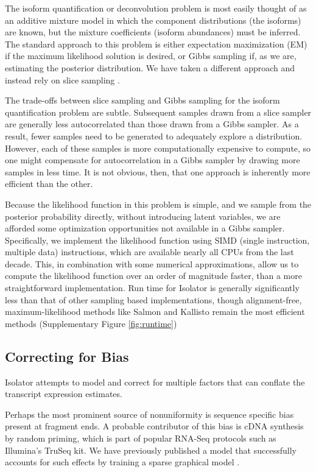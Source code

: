\documentclass[twocolumn]{article}
\begin{document}
The isoform quantification or deconvolution problem is most easily
thought of as an additive mixture model in which the component
distributions (the isoforms) are known, but the mixture coefficients
(isoform abundances) must be inferred. The standard approach to this
problem is either expectation maximization (EM) if the maximum likelihood
solution is desired, or Gibbs sampling if, as we are, estimating the
posterior distribution. We have taken a different approach and instead
rely on slice sampling \cite{Neal:2000uc}.

The trade-offs between slice sampling and Gibbs sampling for the isoform
quantification problem are subtle. Subsequent samples drawn from a slice
sampler are generally less autocorrelated than those drawn from a Gibbs
sampler. As a result, fewer samples need to be generated to adequately
explore a distribution. However, each of these samples is more
computationally expensive to compute, so one might compensate for
autocorrelation in a Gibbs sampler by drawing more samples in less time.
It is not obvious, then, that one approach is inherently more efficient
than the other.

Because the likelihood function in this problem is simple, and we sample from
the posterior probability directly, without introducing latent variables, we are
afforded some optimization opportunities not available in a Gibbs sampler.
Specifically, we implement the likelihood function using SIMD (single
instruction, multiple data) instructions, which are available nearly all CPUs
from the last decade. This, in combination with some numerical approximations,
allow us to compute the likelihood function over an order of magnitude faster,
than a more straightforward implementation. Run time for Isolator is generally
significantly less than that of other sampling based implementations, though
alignment-free, maximum-likelihood methods like Salmon and Kallisto remain the
most efficient methods (Supplementary Figure \ref{fig:runtime})

\subsection{Correcting for Bias}\label{correcting-for-bias}

Isolator attempts to model and correct for multiple factors that can
conflate the transcript expression estimates.

Perhaps the most prominent source of nonuniformity is sequence specific bias
present at fragment ends. A probable contributor of this bias is cDNA synthesis
by random priming, which is part of popular RNA-Seq protocols such as Illumina's
TruSeq kit. We have previously published a model that successfully accounts for
such effects by training a sparse graphical model \cite{Jones:2012hg}.
\end{document}
